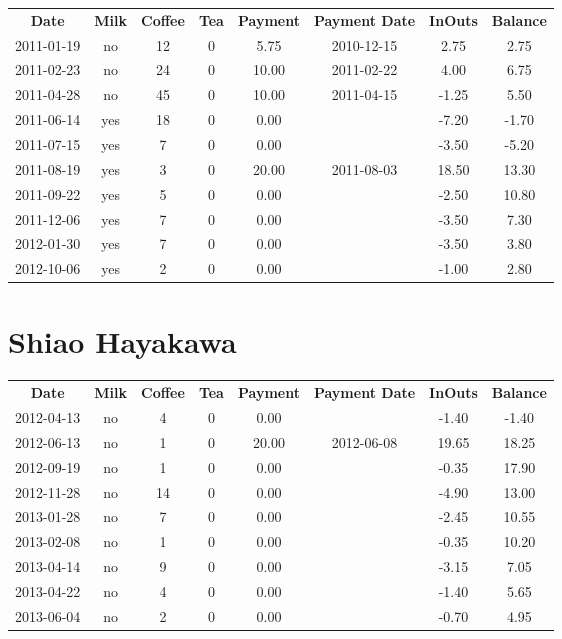 \begin{center}
\begin{tabular}{cccccccc}
\textbf{Date} & \textbf{Milk} & \textbf{Coffee} & \textbf{Tea} & \textbf{Payment} & \textbf{Payment Date} & \textbf{InOuts} & \textbf{Balance} \\
2011-01-19 & no & 12 & 0 &  5.75 & 2010-12-15 &  2.75 &  2.75\\ 
2011-02-23 & no & 24 & 0 & 10.00 & 2011-02-22 &  4.00 &  6.75\\ 
2011-04-28 & no & 45 & 0 & 10.00 & 2011-04-15 & -1.25 &  5.50\\ 
2011-06-14 & yes & 18 & 0 &  0.00 &  & -7.20 & -1.70\\ 
2011-07-15 & yes &  7 & 0 &  0.00 &  & -3.50 & -5.20\\ 
2011-08-19 & yes &  3 & 0 & 20.00 & 2011-08-03 & 18.50 & 13.30\\ 
2011-09-22 & yes &  5 & 0 &  0.00 &  & -2.50 & 10.80\\ 
2011-12-06 & yes &  7 & 0 &  0.00 &  & -3.50 &  7.30\\ 
2012-01-30 & yes &  7 & 0 &  0.00 &  & -3.50 &  3.80\\ 
2012-10-06 & yes &  2 & 0 &  0.00 &  & -1.00 &  2.80
\end{tabular}
\end{center}

\section{Shiao Hayakawa}

\begin{center}
\begin{tabular}{cccccccc}
\textbf{Date} & \textbf{Milk} & \textbf{Coffee} & \textbf{Tea} & \textbf{Payment} & \textbf{Payment Date} & \textbf{InOuts} & \textbf{Balance} \\
2012-04-13 & no &  4 & 0 &  0.00 &  & -1.40 & -1.40\\ 
2012-06-13 & no &  1 & 0 & 20.00 & 2012-06-08 & 19.65 & 18.25\\ 
2012-09-19 & no &  1 & 0 &  0.00 &  & -0.35 & 17.90\\ 
2012-11-28 & no & 14 & 0 &  0.00 &  & -4.90 & 13.00\\ 
2013-01-28 & no &  7 & 0 &  0.00 &  & -2.45 & 10.55\\ 
2013-02-08 & no &  1 & 0 &  0.00 &  & -0.35 & 10.20\\ 
2013-04-14 & no &  9 & 0 &  0.00 &  & -3.15 &  7.05\\ 
2013-04-22 & no &  4 & 0 &  0.00 &  & -1.40 &  5.65\\ 
2013-06-04 & no &  2 & 0 &  0.00 &  & -0.70 &  4.95
\end{tabular}
\end{center}

